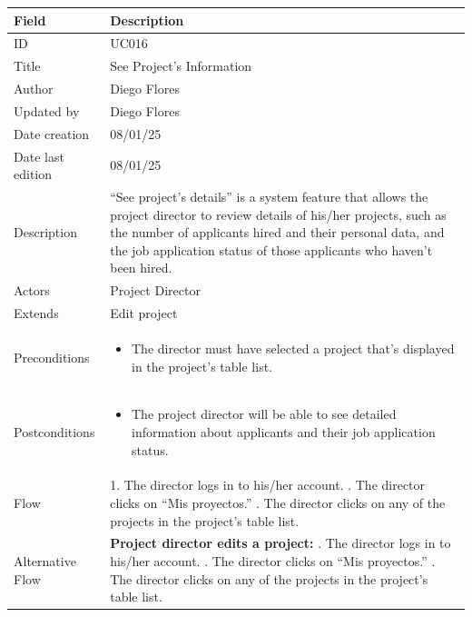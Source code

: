 \documentclass{scrreprt}
\begin{document}
\begin{table}[H]
	\centering
	\begin{tabular}{|p{3cm}|p{10cm}|}
		\hline
		\textbf{Field} & \textbf{Description} \\ \hline
		ID & UC016 \\ \hline
		Title & See Project’s Information \\ \hline
		Author & Diego Flores  \\ \hline
		Updated by & Diego Flores \\ \hline
		Date creation & 08/01/25 \\ \hline
		Date last edition & 08/01/25 \\ \hline
		Description & 
		“See project’s details” is a system feature that allows the project director to review details of his/her projects, such as the number of applicants hired and their personal data, and the job application status of those applicants who haven’t been hired. \\ \hline
		Actors & Project Director \\ \hline
		Extends & Edit project \\ \hline
		Preconditions & 
		\begin{itemize}
			\item The director must have selected a project that’s displayed in the project’s table list.
		\end{itemize} \\ \hline
		Postconditions & 
		\begin{itemize}
			\item The project director will be able to see detailed information about applicants and their job application status.
		\end{itemize} \\ \hline
		Flow & 
		1. The director logs in to his/her account. \newline
		2. The director clicks on “Mis proyectos.” \newline
		3. The director clicks on any of the projects in the project’s table list. \\ \hline
		Alternative Flow & 
		\textbf{Project director edits a project:} \newline
		1. The director logs in to his/her account. \newline
		2. The director clicks on “Mis proyectos.” \newline
		3. The director clicks on any of the projects in the project’s table list. \newline

\end{tabular}
\end{table}
\end{document}
